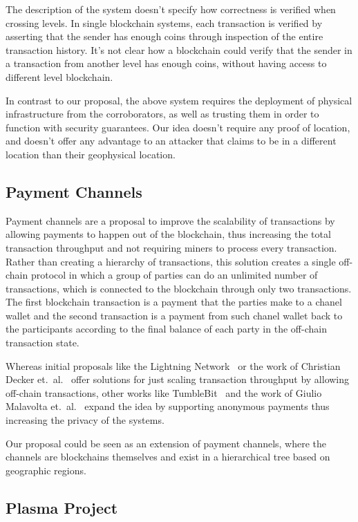 The description of the system doesn't specify how correctness is verified when
crossing levels.  In single blockchain systems, each transaction is verified by
asserting that the sender has enough coins through inspection of the entire
transaction history.  It's not clear how a blockchain could verify that the
sender in a transaction from another level has enough coins, without having
access to different level blockchain.


In contrast to our proposal, the above system requires the deployment of
physical infrastructure from the corroborators, as well as trusting them in
order to function with security guarantees.  Our idea doesn't require any proof
of location, and doesn't offer any advantage to an attacker that claims to be
in a different location than their geophysical location.

\subsection{Payment Channels}

Payment channels are a proposal to improve the scalability of transactions by
allowing payments to happen out of the blockchain, thus increasing the total
transaction throughput and not requiring miners to process every transaction.
Rather than creating a hierarchy of transactions, this solution creates a
single off-chain protocol in which a group of parties can do an unlimited
number of transactions, which is connected to the blockchain through only two
transactions.  The first blockchain transaction is a payment that the parties
make to a chanel wallet and the second transaction is a payment from such
chanel wallet back to the participants according to the final balance of each
party in the off-chain transaction state.

Whereas initial proposals like the Lightning Network~\cite{light} or the work of
Christian Decker et.\ al.~\cite{chan1} offer solutions for just scaling
transaction throughput by allowing off-chain transactions, other works like
TumbleBit~\cite{tumble} and the work of Giulio Malavolta et.\ al.~\cite{chan2}
expand the idea by supporting anonymous payments thus increasing the privacy of
the systems.

Our proposal could be seen as an extension of payment channels, where the
channels are blockchains themselves and exist in a hierarchical tree based on
geographic regions.

\subsection{Plasma Project}

